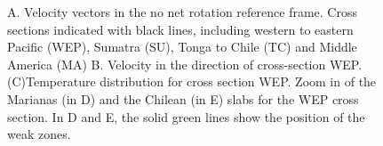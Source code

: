\documentclass[12pt]{article}
\begin{document}
\begin{figure}[hbtp]
\centering
{}
\caption{A. Velocity vectors in the no net rotation reference frame. Cross sections indicated with black lines, including western to eastern Pacific (WEP), Sumatra (SU), Tonga to Chile (TC) and Middle America (MA) B. Velocity in the direction of cross-section WEP.(C)Temperature distribution for cross section WEP. Zoom in of the Marianas (in D) and the Chilean (in E) slabs for the WEP cross section. In D and E, the solid green lines show the position of the weak zones.}
\label{fig:xsection2sumatra}
\end{figure}
\end{document}
